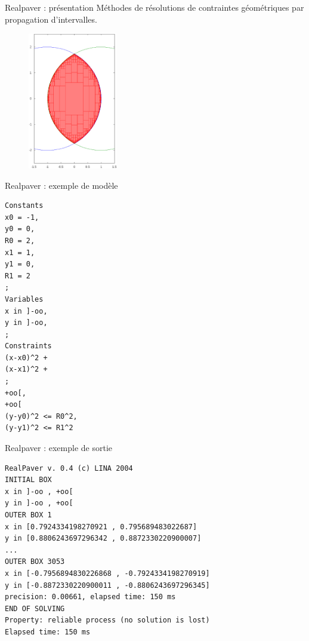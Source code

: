\documentclass[frames,pdf,slideColor,colorBG,accumulate,total]{prosper}
\newcommand{\slidetextsize}{\footnotesize}
\begin{document}
  \begin{slide}[Box]{Realpaver : présentation}
    \slidetextsize
    Méthodes de résolutions de contraintes géométriques par propagation d’intervalles.
    \begin{figure}[t]\centering \includegraphics[width=0.35\textwidth]{img/disk-disk.ps}\end{figure}
  \end{slide}
\begin{slide}{Realpaver : exemple de modèle}
\hypertarget{code}{ }
\tiny\vspace{-.35in}\hspace{-.35in}
\begin{verbatim}
Constants
x0 = -1,
y0 = 0,
R0 = 2,
x1 = 1,
y1 = 0,
R1 = 2
;
Variables
x in ]-oo,
y in ]-oo,
;
Constraints
(x-x0)^2 +
(x-x1)^2 +
;
+oo[,
+oo[
(y-y0)^2 <= R0^2,
(y-y1)^2 <= R1^2
\end{verbatim}
\end{slide}
\begin{slide}{Realpaver : exemple de sortie}
\hypertarget{code}{ }
\tiny\vspace{-.35in}
\begin{verbatim}
RealPaver v. 0.4 (c) LINA 2004
INITIAL BOX
x in ]-oo , +oo[
y in ]-oo , +oo[
OUTER BOX 1
x in [0.7924334198270921 , 0.795689483022687]
y in [0.8806243697296342 , 0.8872330220900007]
...
OUTER BOX 3053
x in [-0.7956894830226868 , -0.7924334198270919]
y in [-0.8872330220900011 , -0.8806243697296345]
precision: 0.00661, elapsed time: 150 ms
END OF SOLVING
Property: reliable process (no solution is lost)
Elapsed time: 150 ms
\end{verbatim}
\end{slide}
\end{document}
